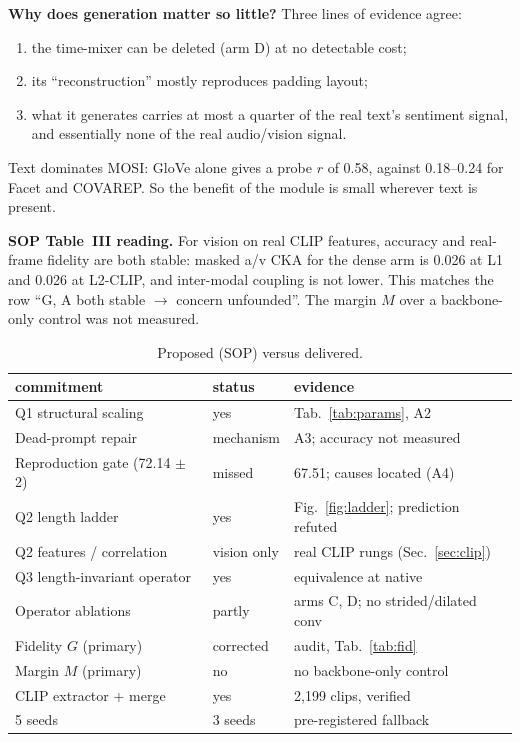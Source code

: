 \documentclass[lettersize,journal]{IEEEtran}
\begin{document}
\textbf{Why does generation matter so little?} Three lines of evidence agree:
\begin{enumerate}
\item the time-mixer can be deleted (arm D) at no detectable cost;
\item its ``reconstruction'' mostly reproduces padding layout;
\item what it generates carries at most a quarter of the real text's sentiment signal, and essentially none of the real audio/vision signal.
\end{enumerate}
Text dominates MOSI: GloVe alone gives a probe $r$ of 0.58, against 0.18--0.24 for Facet and COVAREP. So the benefit of the module is small wherever text is present.

\textbf{SOP Table~III reading.} For vision on real CLIP features, accuracy and real-frame fidelity are both stable: masked a/v CKA for the dense arm is 0.026 at L1 and 0.026 at L2-CLIP, and inter-modal coupling is not lower. This matches the row ``G, A both stable $\rightarrow$ concern unfounded''. The margin $M$ over a backbone-only control was not measured.

\begin{table}[!t]
\caption{Proposed (SOP) versus delivered.\label{tab:sop}}
\centering
\setlength{\tabcolsep}{3pt}
\begin{tabular}{p{3.3cm}p{1.2cm}p{3.5cm}}
\toprule
commitment & status & evidence\\
\midrule
Q1 structural scaling & yes & Tab.~\ref{tab:params}, A2\\
Dead-prompt repair & mechanism & A3; accuracy not measured\\
Reproduction gate (72.14 $\pm$ 2) & missed & 67.51; causes located (A4)\\
Q2 length ladder & yes & Fig.~\ref{fig:ladder}; prediction refuted\\
Q2 features / correlation & vision only & real CLIP rungs (Sec.~\ref{sec:clip})\\
Q3 length-invariant operator & yes & equivalence at native\\
Operator ablations & partly & arms C, D; no strided/dilated conv\\
Fidelity $G$ (primary) & corrected & audit, Tab.~\ref{tab:fid}\\
Margin $M$ (primary) & no & no backbone-only control\\
CLIP extractor + merge & yes & 2,199 clips, verified\\
5 seeds & 3 seeds & pre-registered fallback\\
\bottomrule
\end{tabular}
\end{table}
\end{document}
